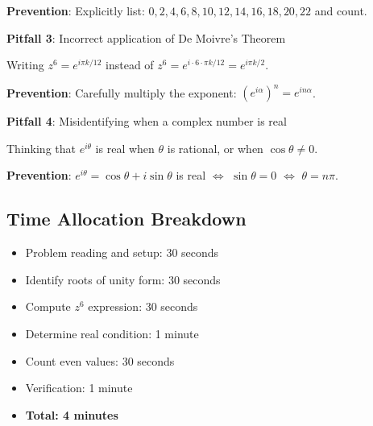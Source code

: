 \documentclass[]{article}
\begin{document}
\begin{solutionbox}
\begin{warningbox}
\textbf{Prevention}: Explicitly list: $0, 2, 4, 6, 8, 10, 12, 14, 16, 18, 20, 22$ and count.
\end{warningbox}

\begin{warningbox}
\textbf{Pitfall 3}: Incorrect application of De Moivre's Theorem

Writing $z^6 = e^{i\pi k/12}$ instead of $z^6 = e^{i \cdot 6 \cdot \pi k/12} = e^{i\pi k/2}$.

\textbf{Prevention}: Carefully multiply the exponent: $(e^{i\alpha})^n = e^{in\alpha}$.
\end{warningbox}

\begin{warningbox}
\textbf{Pitfall 4}: Misidentifying when a complex number is real

Thinking that $e^{i\theta}$ is real when $\theta$ is rational, or when $\cos\theta \neq 0$.

\textbf{Prevention}: $e^{i\theta} = \cos\theta + i\sin\theta$ is real $\Leftrightarrow$ $\sin\theta = 0$ $\Leftrightarrow$ $\theta = n\pi$.
\end{warningbox}

\subsection*{Time Allocation Breakdown}
\begin{itemize}[leftmargin=*]
    \item Problem reading and setup: 30 seconds
    \item Identify roots of unity form: 30 seconds
    \item Compute $z^6$ expression: 30 seconds
    \item Determine real condition: 1 minute
    \item Count even values: 30 seconds
    \item Verification: 1 minute
    \item \textbf{Total: 4 minutes}
\end{itemize}
\end{solutionbox}
\end{document}

